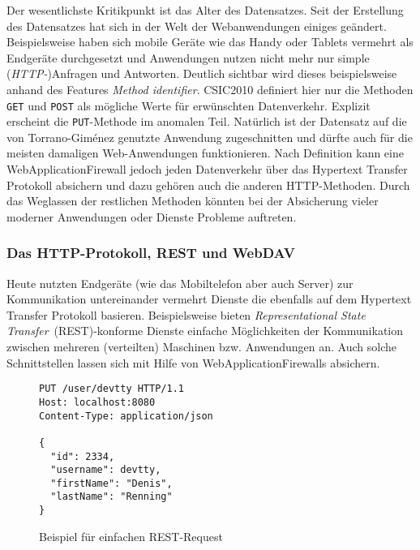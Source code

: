 Der wesentlichste Kritikpunkt ist das Alter des Datensatzes. Seit der Erstellung des Datensatzes hat sich in der Welt der Webanwendungen einiges geändert. Beispielsweise haben sich mobile Geräte wie das Handy oder Tablets vermehrt als Endgeräte durchgesetzt und Anwendungen nutzen nicht mehr nur simple (\emph{HTTP-})Anfragen und Antworten. Deutlich sichtbar wird dieses beispielsweise anhand des Features \glqq\emph{Method identifier}\grqq. CSIC2010 definiert hier nur die Methoden \verb=GET= und \verb=POST= als mögliche Werte für erwünschten Datenverkehr. Explizit erscheint die \verb=PUT=-Methode im anomalen Teil. Natürlich ist der Datensatz auf die von Torrano-Giménez genutzte Anwendung zugeschnitten und dürfte auch für die meisten damaligen Web-Anwendungen funktionieren. Nach Definition kann eine WebApplicationFirewall jedoch jeden Datenverkehr über das Hypertext Transfer Protokoll absichern und dazu gehören auch die anderen HTTP-Methoden. Durch das Weglassen der restlichen Methoden könnten bei der Absicherung vieler moderner Anwendungen oder Dienste Probleme auftreten. 

\subsubsection{Das HTTP-Protokoll, REST und WebDAV}
Heute nutzten Endgeräte (wie das Mobiltelefon aber auch Server) zur Kommunikation untereinander vermehrt Dienste die ebenfalls auf dem Hypertext Transfer Protokoll basieren. Beispielsweise bieten \emph{Representational State Transfer}~(REST)-konforme Dienste einfache Möglichkeiten der Kommunikation zwischen mehreren (verteilten) Maschinen bzw. Anwendungen an. Auch solche Schnittstellen lassen sich mit Hilfe von WebApplicationFirewalls absichern.\\

\begin{figure}[h]
  \caption{Beispiel für einfachen REST-Request}
  \label{fig:restputexample}
  \begin{lstlisting}
PUT /user/devtty HTTP/1.1
Host: localhost:8080
Content-Type: application/json

{
  "id": 2334,
  "username": devtty,
  "firstName": "Denis",
  "lastName": "Renning"
}
\end{lstlisting}
\end{figure}

